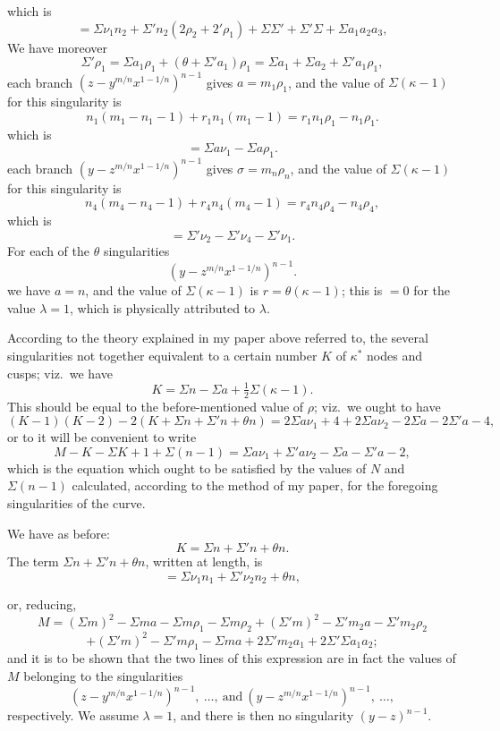 \documentclass[11pt,a4paper]{book}
\begin{document}
\newpage
which is
\[
=\Sigma\nu_1n_2+\Sigma'n_2(2\rho_2+2'\rho_1)+\Sigma\Sigma'+\Sigma'\Sigma+\Sigma a_1 a_2 a_3,
\]
We have moreover
\[
\Sigma'\rho_1=\Sigma a_1\rho_1+(\theta+\Sigma' a_1)\rho_1=\Sigma a_1+\Sigma a_2+\Sigma'a_1\rho_1,
\]
each branch $\left(z-y^{m/n}x^{1-1/n}\right)^{n-1}$ gives $a=m_1\rho_1$, and the value of $\Sigma(\kappa-1)$ for this singularity is
\[
n_1(m_1-n_1-1)+r_1n_1(m_1-1)=r_1n_1\rho_1-n_1\rho_1.
\]
which is
\[
=\Sigma a\nu_1-\Sigma a\rho_1.
\]
each branch $\left(y-z^{m/n}x^{1-1/n}\right)^{n-1}$ gives $\sigma=m_n\rho_n$, and the value of $\Sigma(\kappa-1)$ for this singularity is
\[
n_4(m_4-n_4-1)+r_4n_4(m_4-1)=r_4n_4\rho_4-n_4\rho_4,
\]
which is
\[
=\Sigma'\nu_2-\Sigma'\nu_4-\Sigma'\nu_1.
\]
For each of the $\theta$ singularities
\[
\left(y-z^{m/n}x^{1-1/n}\right)^{n-1}.
\]
we have $a=n$, and the value of $\Sigma(\kappa-1)$ is $r=\theta(\kappa-1)$; this is $=0$ for the value $\lambda=1$, which is physically attributed to $\lambda$.

According to the theory explained in my paper above referred to, the several singularities not together equivalent to a certain number $K$ of $\kappa^*$ nodes and cusps; viz.\ we have
\[
K=\Sigma n-\Sigma a+\tfrac{1}{2}\Sigma(\kappa-1).
\]
This should be equal to the before-mentioned value of $\rho$; viz.\ we ought to have
\[
(K-1)(K-2)-2(K+\Sigma n+\Sigma'n+\theta n)=2\Sigma a\nu_1+4+2\Sigma a\nu_2-2\Sigma a-2\Sigma'a-4,
\]
or to it will be convenient to write
\[
M-K-\Sigma K+1+\Sigma(n-1)=\Sigma a\nu_1+\Sigma'a\nu_2-\Sigma a-\Sigma'a-2,
\]
which is the equation which ought to be satisfied by the values of $N$ and $\Sigma(n-1)$ calculated, according to the method of my paper, for the foregoing singularities of the curve.

We have as before:
\[
K=\Sigma n+\Sigma'n+\theta n.
\]
The term $\Sigma n+\Sigma'n+\theta n$, written at length, is
\[
=\Sigma\nu_1n_1+\Sigma'\nu_2n_2+\theta n,
\]

\newpage
or, reducing,
\[
M=(\Sigma m)^2-\Sigma m a-\Sigma m \rho_1-\Sigma m \rho_2+(\Sigma' m)^2-\Sigma' m_2 a-\Sigma' m_2 \rho_2
\]
\[
+(\Sigma' m)^2-\Sigma' m\rho_1-\Sigma m a+2\Sigma' m_2 a_1+2\Sigma'\Sigma a_1 a_2;
\]
and it is to be shown that the two lines of this expression are in fact the values of $M$ belonging to the singularities
\[
\left(z-y^{m/n}x^{1-1/n}\right)^{n-1},\ \dots,\ \text{and}\ \left(y-z^{m/n}x^{1-1/n}\right)^{n-1},\ \dots,
\]
respectively. We assume $\lambda=1$, and there is then no singularity $\left(y-z\right)^{n-1}$.
\end{document}
